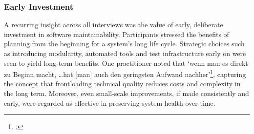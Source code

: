 \subsubsection{Early Investment}
A recurring insight across all interviews was the value of early, deliberate investment in software maintainability. Participants stressed the benefits of planning from the beginning for a system's long life cycle. Strategic choices such as introducing modularity, automated tools and test infrastructure early on were seen to yield long-term benefits.
One practitioner noted that `wenn man es direkt zu Beginn macht, \ldots hat [man] auch den geringsten Aufwand nachher'\footcite{Interview32025}, capturing the concept that frontloading technical quality reduces costs and complexity in the long term. Moreover, even small-scale improvements, if made consistently and early, were regarded as effective in preserving system health over time.

